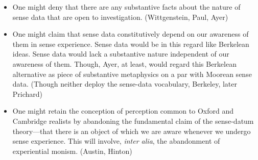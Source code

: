 \documentclass[11pt]{article}
\begin{document}
\begin{itemize}
	\item One might deny that there are any substantive facts about the nature of sense data that are open to investigation. (Wittgenstein, Paul, Ayer)
	\item One might claim that sense data constitutively depend on our awareness of them in sense experience. Sense data would be in this regard like Berkelean ideas. Sense data would lack a substantive nature independent of our awareness of them. Though, Ayer, at least, would regard this Berkelean alternative as piece of substantive metaphysics on a par with Moorean sense data. (Though neither deploy the sense-data vocabulary, Berkeley, later Prichard)
	\item One might retain the conception of perception common to Oxford and Cambridge realists by abandoning the fundamental claim of the sense-datum theory---that there is an object of which we are aware whenever we undergo sense experience. This will involve, \emph{inter alia}, the abandonment of experiential monism. (Austin, Hinton)
\end{itemize}



 

\end{document}
